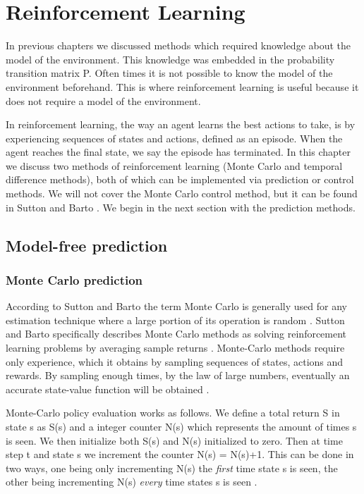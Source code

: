 \graphicspath{{RL/fig}}
\chapter{Reinforcement Learning}
\label{chap:RL}

In previous chapters we discussed methods which required knowledge about the model of the environment. This knowledge was embedded in the probability transition matrix P. Often times it is not possible to know the model of the environment beforehand. This is where reinforcement learning is useful because it does not require a model of the environment.

In reinforcement learning, the way an agent learns the best actions to take, is by experiencing sequences of states and actions, defined as an episode. When the agent reaches the final state, we say the episode has terminated. In this chapter we discuss two methods of reinforcement learning (Monte Carlo and temporal difference methods), both of which can be implemented via prediction or control methods. We will not cover the Monte Carlo control method, but it can be found in Sutton and Barto \cite{sutton_barto}. We begin in the next section with the prediction methods.
\section{Model-free prediction}
\subsection{Monte Carlo prediction}
According to Sutton and Barto the term Monte Carlo is generally used for
any estimation technique where a large portion of its operation is random \cite{sutton_barto}.
Sutton and Barto specifically describes Monte Carlo methods as solving reinforcement learning problems by averaging sample returns \cite{sutton_barto}.
Monte-Carlo methods require only experience, which it obtains by sampling sequences of states, actions and rewards. By sampling enough times, by the law of large numbers, eventually an accurate state-value function will be obtained  \cite{sutton_barto}.

Monte-Carlo policy evaluation works as follows. We define a total return S in state s as S(s) and a integer counter N(s) which represents the amount of times s is seen. We then initialize both S(s) and N(s) initialized to zero. 
Then at time step t and state s we increment the counter N(s) = N(s)+1. This can be done in two ways, one being only incrementing N(s) the \textit{first} time state s is seen, the other being incrementing N(s) \textit{every} time states s is seen \cite{sutton_barto}.

